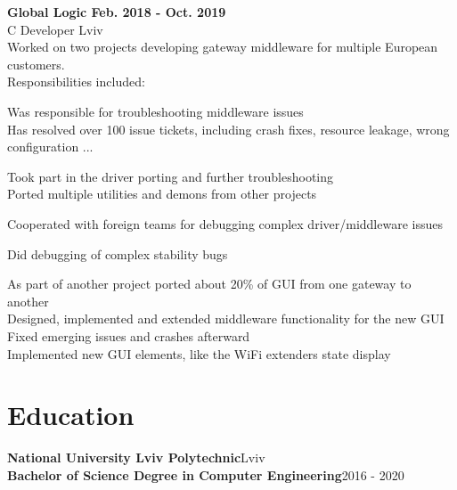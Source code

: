 \documentclass{article}
\begin{document}
{\bfseries
Global Logic \hspace*{\fill}Feb. 2018 - Oct. 2019\\
}
\vspace{0.5em}
C Developer  \hspace*{\fill}Lviv\\
Worked on two projects developing gateway middleware for multiple European customers.\\
Responsibilities included:
\begin{description}[align=left,leftmargin=3mm,style=multiline]
\item[-] Was responsible for troubleshooting middleware issues \\
         Has resolved over 100 issue tickets, including crash fixes, resource leakage,
         wrong configuration ...
\item[-] Took part in the driver porting and further troubleshooting \\
         Ported multiple utilities and demons from other projects
\item[-] Cooperated with foreign teams for debugging complex driver/middleware issues
\item[-] Did debugging of complex stability bugs
\item[-] As part of another project ported about 20\% of GUI from one gateway to another \\
         Designed, implemented and extended middleware functionality for the new GUI \\
         Fixed emerging issues and crashes afterward \\
         Implemented new GUI elements, like the WiFi extenders state display 
\end{description}

\section{Education}
\textbf{National University Lviv Polytechnic}\hspace*{\fill}Lviv\\
\textbf{Bachelor of Science Degree in Computer Engineering}\hspace*{\fill}2016 - 2020
\end{document}

